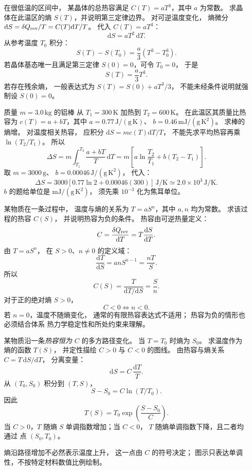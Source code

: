 在很低温的区间中，
某晶体的总热容满足
$C(T)=aT^3$，其中 $a$ 为常数。
求晶体在此温区的熵
$S(T)$，并说明第三定律边界。
\exsolution
对可逆温度变化，
熵微分
$\mathrm dS=\delta Q_{\rm rev}/T
=C(T)\mathrm dT/T$。
代入 $C(T)=aT^3$：
\[
\mathrm dS=aT^2\,\mathrm dT.
\]
从参考温度 $T_0$ 积分：
\[
S(T)-S(T_0)
=\frac a3(T^3-T_0^3).
\]
若晶体基态唯一且满足第三定律
$S(0)=0$，可令 $T_0=0$，
于是
\[
\boxed{S(T)=\frac a3T^3}.
\]
\excheck 若存在残余熵，
一般表达式为
$S(T)=S(0)+aT^3/3$，
不能未经条件说明就强制设 $S(0)=0$。

质量 $m=3.0\,\mathrm{kg}$ 的铝棒
从 $T_1=300\,\mathrm K$ 加热到
$T_2=600\,\mathrm K$。
在此温区其质量比热容为
$c(T)=a+bT$，其中
$a=0.77\,\mathrm{J/(g\,K)}$、
$b=0.46\,\mathrm{mJ/(g\,K^2)}$。
求棒的熵增。
\exsolution
对温度相关热容，
应积分 $\mathrm dS=mc(T)\mathrm dT/T$，
不能先求平均热容再乘 $\ln(T_2/T_1)$。
所以
\[
\Delta S=m\int_{T_1}^{T_2}
\frac{a+bT}{T}\,\mathrm dT
=m\left[a\ln\frac{T_2}{T_1}
+b(T_2-T_1)\right].
\]
取 $m=3000\,\mathrm g$、
$b=0.00046\,\mathrm{J/(g\,K^2)}$，
代入：
\[
\boxed{\Delta S=3000
[0.77\ln2+0.00046(300)]
\,\mathrm{J/K}
\simeq2.0\times10^3\,\mathrm{J/K}}.
\]
\excheck $b$ 的题给单位是
$\mathrm{mJ/(g\,K^2)}$，
须先乘 $10^{-3}$ 化为焦耳单位。

某物质在一条过程中，
温度与熵的关系为
$T=aS^n$，其中 $a,n$ 均为常数。
求该过程的热容 $C(S)$，
并说明热容为负的条件。
\exsolution
热容由可逆热量定义：
\[
C=\frac{\delta Q_{\rm rev}}{\mathrm dT}
=T\frac{\mathrm dS}{\mathrm dT}.
\]
由 $T=aS^n$，
在 $S>0$、$n\ne0$ 的定义域：
\[
\frac{\mathrm dT}{\mathrm dS}
=anS^{n-1}=\frac{nT}{S}.
\]
所以
\[
\boxed{C(S)=\frac{T}{\mathrm dT/\mathrm dS}
=\frac{S}{n}}.
\]
对于正的绝对熵 $S>0$，
\[
\boxed{C<0\iff n<0}.
\]
\excheck 若 $n=0$，温度不随熵变化，
通常的有限热容表达式不适用；
热容为负的情形也必须结合体系
热力学稳定性和所处约束来理解。

某物质沿一条\emph{热容恒为 $C$}
的多方路径变化。
当 $T=T_0$ 时熵为 $S_0$。
求温度作为熵的函数 $T(S)$，
并定性描绘 $C>0$ 与 $C<0$ 的图线。
\exsolution
由热容与熵关系
$C=T\,\mathrm dS/\mathrm dT$，
分离变量：
\[
\mathrm dS=C\,\frac{\mathrm dT}{T}.
\]
从 $(T_0,S_0)$ 积分到 $(T,S)$，
\[
S-S_0=C\ln(T/T_0).
\]
因此
\[
\boxed{T(S)=T_0
\exp\left(\frac{S-S_0}{C}\right)}.
\]
当 $C>0$，$T$ 随熵 $S$
单调指数增加；当 $C<0$，
$T$ 随熵单调指数下降，且二者均通过
点 $(S_0,T_0)$。
\begin{center}
\end{center}
\excheck 熵沿路径增加不必然表示温度上升，
这一点由 $C$ 的符号决定；
图示只表达单调性，不按特定材料数值比例绘制。

